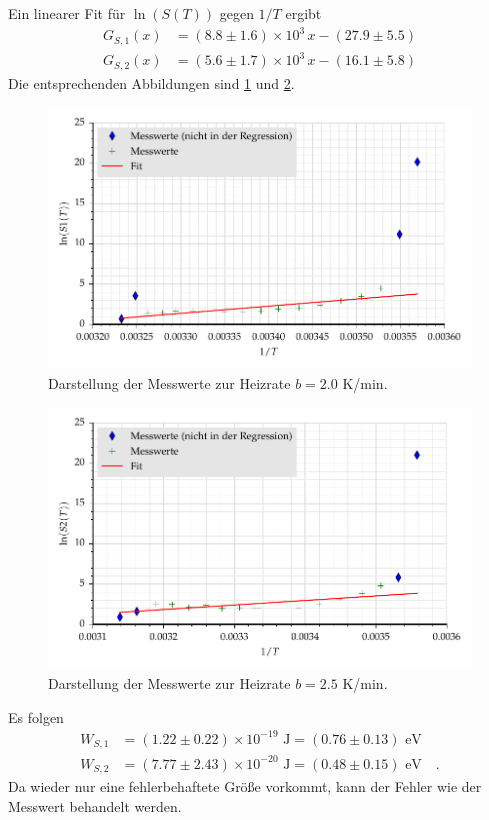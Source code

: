  Ein linearer Fit für $\ln(S(T))$ gegen $1/T$ ergibt
%
%
\begin{align}
G_{S,1}(x)&= (8.8 \pm 1.6 )\times 10^{3} \,x - (27.9 \pm 5.5)  \\
G_{S,2}(x)&= (5.6 \pm 1.7 )\times 10^{3} \,x - (16.1 \pm 5.8)
\end{align}
Die entsprechenden Abbildungen sind \ref{fig:GS1} und \ref{fig:GS2}.
\begin{figure}[h]
\centering
\includegraphics[scale=0.8]{../skript/S1.pdf}
\caption{Darstellung der Messwerte zur Heizrate $b=2.0$ K/min.}
\label{fig:GS1}
\end{figure}
\begin{figure}[h]
\centering
\includegraphics[scale=0.8]{../skript/S2.pdf}
\caption{Darstellung der Messwerte zur Heizrate $b=2.5$ K/min.}
\label{fig:GS2}
\end{figure}
Es folgen
\begin{align}
W_{S,1}&=  (1.22 \pm 0.22)\times 10^{-19}\text{ J} = (0.76\pm 0.13)\text{ eV} \label{W1} \\
W_{S,2}&=  (7.77 \pm 2.43) \times 10^{-20}\text{ J} = (0.48\pm 0.15)\text{ eV}\quad . \label{W2}
\end{align}
Da wieder nur eine fehlerbehaftete Größe vorkommt, kann der Fehler wie der
Messwert behandelt werden.


